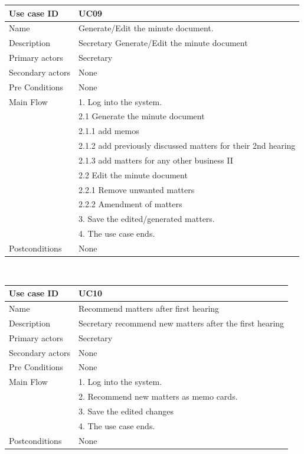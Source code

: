 \documentclass[a4paper,beamer]{article}
\begin{document}
			\begin{tabular}{|p{4cm}|p{8cm}|} \hline 
					\textbf{Use case ID} & \textbf{UC09}  \\ \hline
					Name & Generate/Edit the minute document. \\ \hline 
					Description & Secretary Generate/Edit the minute document \\ \hline 
					Primary actors & Secretary \\ \hline 
					Secondary actors & None \\ \hline 
					Pre Conditions & None \\ \hline
					Main Flow &	1. Log into the system.\\
										& 2.1 Generate the minute document\\
										& 2.1.1 add memos\\
										& 2.1.2 add previously discussed matters for their 2nd hearing \\
										& 2.1.3 add matters for any other business II\\
										& 2.2 Edit the minute document \\
										& 2.2.1 Remove unwanted matters\\
										& 2.2.2 Amendment of matters\\
										& 3. Save the edited/generated  matters.\\
										& 4. The use case ends.\\ \hline
					Postconditions & None \\ \hline 
			\end{tabular} \\[.6cm]
			
			\begin{tabular}{|p{4cm}|p{8cm}|} \hline 
					\textbf{Use case ID} & \textbf{UC10}  \\ \hline
					Name & Recommend matters after first hearing \\ \hline 
					Description & Secretary recommend new matters after the first hearing \\ \hline 
					Primary actors & Secretary \\ \hline 
					Secondary actors & None \\ \hline 
					Pre Conditions & None \\ \hline
					Main Flow & 1. Log into the system.\\
										& 2. Recommend new matters as memo cards.\\
										& 3. Save the edited changes \\
										& 4. The use case ends.\\ \hline
					Postconditions & None \\ \hline 
			\end{tabular} \\[.6cm]
			
\end{document}
